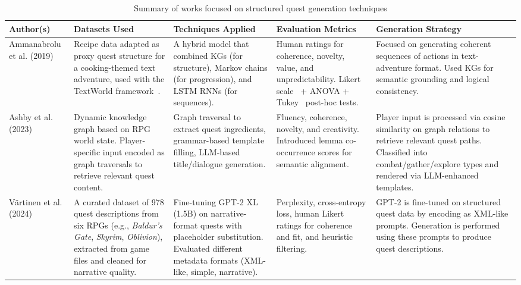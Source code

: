 \begin{table}[t]
  \centering
  \scriptsize
  \renewcommand{\arraystretch}{1.3}
  \begin{tabularx}{0.95\textwidth}{
    >{\raggedright\arraybackslash}X
    >{\raggedright\arraybackslash}X
    >{\raggedright\arraybackslash}X
    >{\raggedright\arraybackslash}X
    >{\raggedright\arraybackslash}X
  }
    \toprule
    \textbf{Author(s)} & \textbf{Datasets Used} & \textbf{Techniques Applied} & \textbf{Evaluation Metrics} & \textbf{Generation Strategy} \\
    \midrule
    
    Ammanabrolu et al. (2019)~\cite{ammanabrolu2019toward}
      & Recipe data adapted as proxy quest structure for a cooking-themed text adventure, used with the TextWorld framework~\cite{cote2019textworld}.
      & A hybrid model that combined KGs (for structure), Markov chains (for progression), and LSTM RNNs (for sequences).
      & Human ratings for coherence, novelty, value, and unpredictability. Likert scale~\cite{joshi2015likert} + ANOVA + Tukey~\cite{abdi2010tukey} post-hoc tests.
      & Focused on generating coherent sequences of actions in text-adventure format. Used KGs for semantic grounding and logical consistency. \\
    
    Ashby et al. (2023)~\cite{ashby2023personalized}
      & Dynamic knowledge graph based on RPG world state. Player-specific input encoded as graph traversals to retrieve relevant quest content.
      & Graph traversal to extract quest ingredients, grammar-based template filling, LLM-based title/dialogue generation.
      & Fluency, coherence, novelty, and creativity. Introduced lemma co-occurrence scores for semantic alignment.
      & Player input is processed via cosine similarity on graph relations to retrieve relevant quest paths. Classified into combat/gather/explore types and rendered via LLM-enhanced templates. \\
    
    V{\"a}rtinen et al. (2024)~\cite{vartinen2022generating}
      & A curated dataset of 978 quest descriptions from six RPGs (e.g., \textit{Baldur's Gate}, \textit{Skyrim}, \textit{Oblivion}), extracted from game files and cleaned for narrative quality.
      & Fine-tuning GPT-2 XL (1.5B) on narrative-format quests with placeholder substitution. Evaluated different metadata formats (XML-like, simple, narrative).
      & Perplexity, cross-entropy loss, human Likert ratings for coherence and fit, and heuristic filtering.
      & GPT-2 is fine-tuned on structured quest data by encoding as XML-like prompts. Generation is performed using these prompts to produce quest descriptions. \\
    
    \bottomrule
  \end{tabularx}
  \caption{Summary of works focused on structured quest generation techniques}
  \label{table:key-works}
\end{table}

